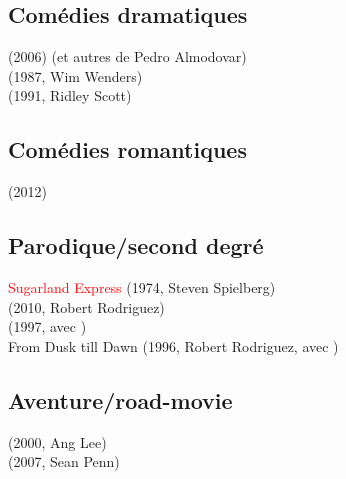 \subsection{Comédies dramatiques}
 (2006) (et autres de Pedro Almodovar) \beau \\
 (1987, Wim Wenders) \\
 (1991, Ridley Scott) \\

\subsection{Comédies romantiques}
 (2012) \\


\subsection{Parodique/second degré}
\textcolor{red}{Sugarland Express} (1974, Steven Spielberg) \\
  (2010, Robert Rodriguez) \\
  (1997, avec \JavierBardem) \\
From Dusk till Dawn (1996, Robert Rodriguez, avec \HarveyKeitel)\\

\subsection{Aventure/road-movie}
 (2000, Ang Lee) \beau \\
 (2007, Sean Penn) \\

